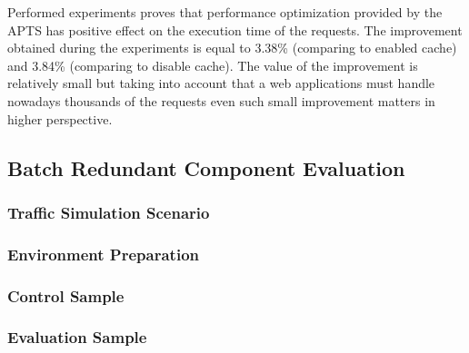 \documentclass[10pt,a4paper]{article}
\begin{document}
Performed experiments proves that performance optimization provided by the APTS has positive effect on the execution time of the requests. The improvement obtained during the experiments is equal to 3.38\% (comparing to enabled cache) and 3.84\% (comparing to disable cache). The value of the improvement is relatively small but taking into account that a web applications must handle nowadays thousands of the requests even such small improvement matters in higher perspective.  

 

\subsection{Batch Redundant Component Evaluation}
\subsubsection{Traffic Simulation Scenario} 
\subsubsection{Environment Preparation} 
\subsubsection{Control Sample} 
\subsubsection{Evaluation Sample} 
\end{document}
